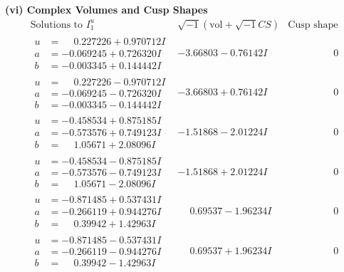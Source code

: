 \documentclass[1p]{elsarticle_modified}
\theoremstyle{definition}
\newcommand{\I}{\sqrt{-1}}
\begin{document}
\newpage\flushleft \textbf{(vi) Complex Volumes and Cusp Shapes}
$$\begin{array}{c|c|c}  
\text{Solutions to }I^u_{1}& \I (\text{vol} + \sqrt{-1}CS) & \text{Cusp shape}\\
 \hline 
\begin{aligned}
u &= \phantom{-}0.227226 + 0.970712 I \\
a &= -0.069245 + 0.726320 I \\
b &= -0.003345 + 0.144442 I\end{aligned}
 & -3.66803 - 0.76142 I & \phantom{-0.000000 } 0 \\ \hline\begin{aligned}
u &= \phantom{-}0.227226 - 0.970712 I \\
a &= -0.069245 - 0.726320 I \\
b &= -0.003345 - 0.144442 I\end{aligned}
 & -3.66803 + 0.76142 I & \phantom{-0.000000 } 0 \\ \hline\begin{aligned}
u &= -0.458534 + 0.875185 I \\
a &= -0.573576 + 0.749123 I \\
b &= \phantom{-}1.05671 + 2.08096 I\end{aligned}
 & -1.51868 - 2.01224 I & \phantom{-0.000000 } 0 \\ \hline\begin{aligned}
u &= -0.458534 - 0.875185 I \\
a &= -0.573576 - 0.749123 I \\
b &= \phantom{-}1.05671 - 2.08096 I\end{aligned}
 & -1.51868 + 2.01224 I & \phantom{-0.000000 } 0 \\ \hline\begin{aligned}
u &= -0.871485 + 0.537431 I \\
a &= -0.266119 + 0.944276 I \\
b &= \phantom{-}0.39942 + 1.42963 I\end{aligned}
 & \phantom{-}0.69537 - 1.96234 I & \phantom{-0.000000 } 0 \\ \hline\begin{aligned}
u &= -0.871485 - 0.537431 I \\
a &= -0.266119 - 0.944276 I \\
b &= \phantom{-}0.39942 - 1.42963 I\end{aligned}
 & \phantom{-}0.69537 + 1.96234 I & \phantom{-0.000000 } 0 \\ \hline\begin{aligned}

\end{aligned}
\end{array}$$
\end{document}
